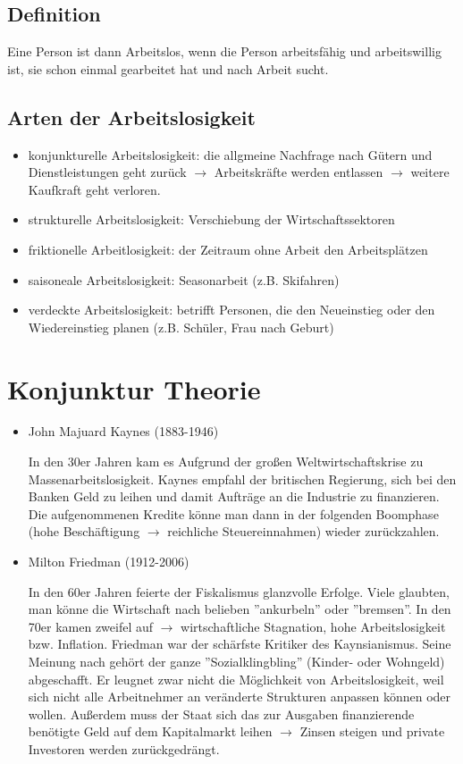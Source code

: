\documentclass[a4paper]{report}
\begin{document}
\section{Definition}

Eine Person ist dann Arbeitslos, wenn die Person arbeitsfähig und arbeitswillig ist, sie schon einmal gearbeitet hat und nach Arbeit sucht.

\section{Arten der Arbeitslosigkeit}

\begin{itemize}
\item konjunkturelle Arbeitslosigkeit: die allgmeine Nachfrage nach Gütern und Dienstleistungen geht zurück $\rightarrow$ Arbeitskräfte werden entlassen $\rightarrow$ weitere Kaufkraft geht verloren.
\item strukturelle Arbeitslosigkeit: Verschiebung der Wirtschaftssektoren
\item friktionelle Arbeitlosigkeit: der Zeitraum ohne Arbeit den Arbeitsplätzen
\item saisoneale Arbeitslosigkeit: Seasonarbeit (z.B. Skifahren)
\item verdeckte Arbeitslosigkeit: betrifft Personen, die den Neueinstieg oder den Wiedereinstieg planen (z.B. Schüler, Frau nach Geburt)
\end{itemize}

\chapter{Konjunktur Theorie}

\begin{itemize}
\item John Majuard Kaynes (1883-1946)

In den 30er Jahren kam es Aufgrund der großen Weltwirtschaftskrise zu Massenarbeitslosigkeit. Kaynes empfahl der britischen Regierung, sich bei den Banken Geld zu leihen und damit Aufträge an die Industrie zu finanzieren. Die aufgenommenen Kredite könne man dann in der folgenden Boomphase (hohe Beschäftigung $\rightarrow$ reichliche Steuereinnahmen) wieder zurückzahlen.

\item Milton Friedman (1912-2006)

In den 60er Jahren feierte der Fiskalismus glanzvolle Erfolge. Viele glaubten, man könne die Wirtschaft nach belieben ''ankurbeln'' oder ''bremsen''. In den 70er kamen zweifel auf $\rightarrow$ wirtschaftliche Stagnation, hohe Arbeitslosigkeit bzw. Inflation. Friedman war der schärfste Kritiker des Kaynsianismus. Seine Meinung nach gehört der ganze ''Sozialklingbling'' (Kinder- oder Wohngeld) abgeschafft. Er leugnet zwar nicht die Möglichkeit von Arbeitslosigkeit, weil sich nicht alle Arbeitnehmer an veränderte Strukturen anpassen können oder wollen. Außerdem muss der Staat sich das zur Ausgaben finanzierende benötigte Geld auf dem Kapitalmarkt leihen $\rightarrow$ Zinsen steigen und private Investoren werden zurückgedrängt.
\end{itemize}
\end{document}
